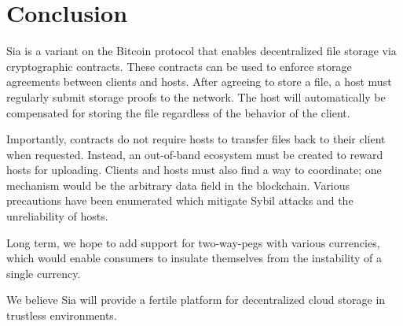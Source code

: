 \documentclass[twocolumn]{article}
\begin{document}


\section{Conclusion}
Sia is a variant on the Bitcoin protocol that enables decentralized file storage via cryptographic contracts.
These contracts can be used to enforce storage agreements between clients and hosts.
After agreeing to store a file, a host must regularly submit storage proofs to the network.
The host will automatically be compensated for storing the file regardless of the behavior of the client.

Importantly, contracts do not require hosts to transfer files back to their client when requested.
Instead, an out-of-band ecosystem must be created to reward hosts for uploading.
Clients and hosts must also find a way to coordinate; one mechanism would be the arbitrary data field in the blockchain.
Various precautions have been enumerated which mitigate Sybil attacks and the unreliability of hosts.

Long term, we hope to add support for two-way-pegs with various currencies, which would enable consumers to insulate themselves from the instability of a single currency.

We believe Sia will provide a fertile platform for decentralized cloud storage in trustless environments.
\end{document}

